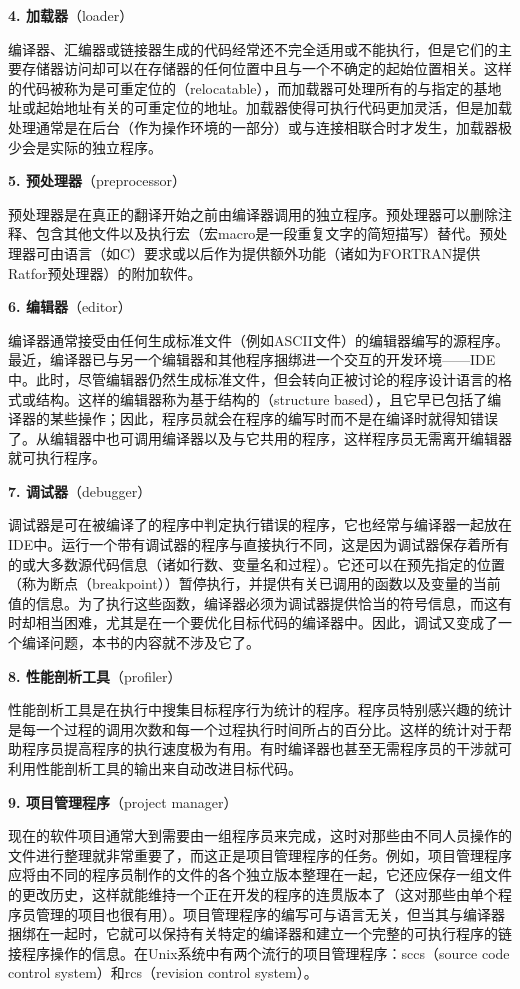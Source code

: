 \documentclass[lang=cn,10pt]{elegantbook}
\begin{document}
\textbf{4. 加载器}（loader）

编译器、汇编器或链接器生成的代码经常还不完全适用或不能执行，但是它们的主要存储器访问却可以在存储器的任何位置中且与一个不确定的起始位置相关。这样的代码被称为是可重定位的（relocatable），而加载器可处理所有的与指定的基地址或起始地址有关的可重定位的地址。加载器使得可执行代码更加灵活，但是加载处理通常是在后台（作为操作环境的一部分）或与连接相联合时才发生，加载器极少会是实际的独立程序。

\textbf{5. 预处理器}（preprocessor）

预处理器是在真正的翻译开始之前由编译器调用的独立程序。预处理器可以删除注释、包含其他文件以及执行宏（宏macro是一段重复文字的简短描写）替代。预处理器可由语言（如C）要求或以后作为提供额外功能（诸如为FORTRAN提供Ratfor预处理器）的附加软件。

\textbf{6. 编辑器}（editor）

编译器通常接受由任何生成标准文件（例如ASCII文件）的编辑器编写的源程序。最近，编译器已与另一个编辑器和其他程序捆绑进一个交互的开发环境——IDE中。此时，尽管编辑器仍然生成标准文件，但会转向正被讨论的程序设计语言的格式或结构。这样的编辑器称为基于结构的（structure based），且它早已包括了编译器的某些操作；因此，程序员就会在程序的编写时而不是在编译时就得知错误了。从编辑器中也可调用编译器以及与它共用的程序，这样程序员无需离开编辑器就可执行程序。

\textbf{7. 调试器}（debugger）

调试器是可在被编译了的程序中判定执行错误的程序，它也经常与编译器一起放在IDE中。运行一个带有调试器的程序与直接执行不同，这是因为调试器保存着所有的或大多数源代码信息（诸如行数、变量名和过程）。它还可以在预先指定的位置（称为断点（breakpoint））暂停执行，并提供有关已调用的函数以及变量的当前值的信息。为了执行这些函数，编译器必须为调试器提供恰当的符号信息，而这有时却相当困难，尤其是在一个要优化目标代码的编译器中。因此，调试又变成了一个编译问题，本书的内容就不涉及它了。

\textbf{8. 性能剖析工具}（profiler）

性能剖析工具是在执行中搜集目标程序行为统计的程序。程序员特别感兴趣的统计是每一个过程的调用次数和每一个过程执行时间所占的百分比。这样的统计对于帮助程序员提高程序的执行速度极为有用。有时编译器也甚至无需程序员的干涉就可利用性能剖析工具的输出来自动改进目标代码。

\textbf{9. 项目管理程序}（project manager）

现在的软件项目通常大到需要由一组程序员来完成，这时对那些由不同人员操作的文件进行整理就非常重要了，而这正是项目管理程序的任务。例如，项目管理程序应将由不同的程序员制作的文件的各个独立版本整理在一起，它还应保存一组文件的更改历史，这样就能维持一个正在开发的程序的连贯版本了（这对那些由单个程序员管理的项目也很有用）。项目管理程序的编写可与语言无关，但当其与编译器捆绑在一起时，它就可以保持有关特定的编译器和建立一个完整的可执行程序的链接程序操作的信息。在Unix系统中有两个流行的项目管理程序：sccs（source code control system）和rcs（revision control system）。
\end{document}
